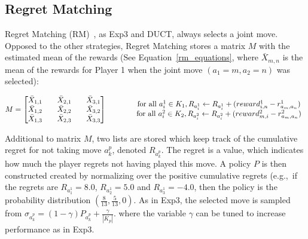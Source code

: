 \documentclass{article}
\newcommand{\eg}{{e.g.,}~}
\begin{document}


\subsection{Regret Matching}
\label{subsec:rm}
Regret Matching (RM)~\cite{Hart00}, as Exp3 and DUCT, always selects a joint move. Opposed to the other strategies, Regret Matching stores a matrix $M$ with the estimated mean of the rewards (See Equation~\ref{rm_equations}, where $\bar{X}_{m,n}$ is the mean of the rewards for Player 1 when the joint move $(a_{1}=m,a_{2}=n)$ was selected):

\begin{equation}
\label{rm_equations}
M = 
\begin{bmatrix}
\bar{X}_{1,1} && \bar{X}_{2,1} && \bar{X}_{3,1} \\
\bar{X}_{1,2} && \bar{X}_{2,2} && \bar{X}_{3,2} \\
\bar{X}_{1,3} && \bar{X}_{2,3} && \bar{X}_{3,3}
\end{bmatrix}
\mbox{ \hspace{1cm} }
\begin{array}{c}
\mbox{for all } a^{1}_{i} \in K_{1}, R_{a^{1}_{i}} \leftarrow R_{a^{1}_{i}} + (reward^1_{i,n} - r^{1}_{a_{m},a_{n}})\\
\mbox{for all } a^{2}_{i} \in K_{2}, R_{a^{2}_{i}} \leftarrow R_{a^{2}_{i}} + (reward^2_{m,i} - r^{2}_{a_{m},a_{n}})
\end{array}
\end{equation}

Additional to matrix $M$, two lists are stored which keep track of the cumulative regret for not taking move $a^p_k$, denoted $R_{a^{p}_{k}}$.
The regret is a value, which indicates how much the player regrets not having played this move. 
A policy $P$ is then constructed created by normalizing over the positive cumulative regrets (\eg if the regrets are $R_{a^{1}_{1}} = 8.0$, $R_{a^{1}_{2}} = 5.0$ and $R_{a^{1}_{3}} = -4.0$, then the policy is the probability distribution $(\frac{8}{13}, \frac{5}{13}, 0)$. 
As in Exp3, the selected move is sampled from $\sigma_{a^{p}_{k}}=(1-\gamma) P_{a^{p}_{k}} + \frac{\gamma}{|K_{p}|}$. 
where the variable $\gamma$ can be tuned to increase performance as in Exp3.
\end{document}

